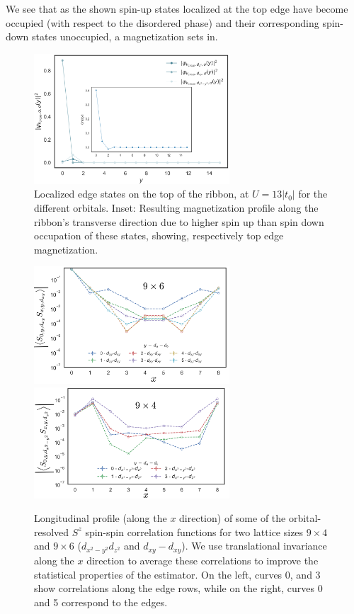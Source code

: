 We see that as the shown spin-up states localized at the top edge have become occupied (with respect to the disordered phase) and their corresponding spin-down states unoccupied, a magnetization sets in.
\begin{figure}[H]
  \centering
  \includegraphics[width=7.3cm]{images/topEdgeMagProfU13.png}
  \caption{Localized edge states on the top of the ribbon, at $U = 13 |t_0|$ for the different orbitals. Inset: Resulting magnetization profile along the ribbon's transverse direction due to higher spin up than spin down occupation of these states, showing, respectively top edge magnetization.}
  \label{topEdge}
\end{figure}
\begin{figure}[H]
  \centering
  \includegraphics[width=7.3cm]{images/tmdFinalxyxy.png} \\
    \includegraphics[width=7.3cm]{images/tmdFinalx2y2z2.png}
  \caption{Longitudinal profile (along the $x$ direction) of some of the orbital-resolved $S^z$ spin-spin correlation functions for two lattice sizes $9 \times 4$ and $9 \times 6$ ($d_{x^2-y^2} d_{z^2}$ and $d_{xy} - d_{xy}$).
	We use translational invariance along the $x$ direction to average these correlations to improve the statistical properties of the estimator.
	On the left, curves 0, and 3 show correlations along the edge rows, while on the right, curves 0 and 5 correspond to the edges.}
  \label{fig:corrQMC}
\end{figure}
